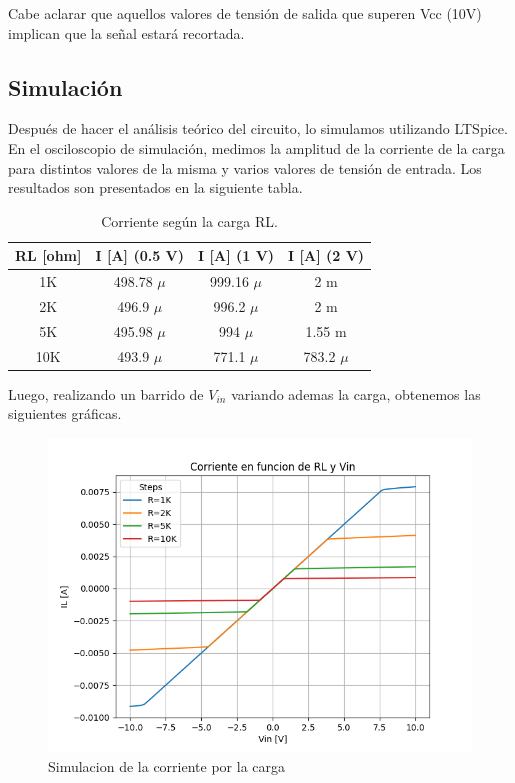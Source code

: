Cabe aclarar que aquellos valores de tensión de salida que superen Vcc (10V) implican que la señal estará recortada.


\subsection{Simulación}
Después de hacer el análisis teórico del circuito, lo simulamos utilizando LTSpice. En el osciloscopio de simulación, medimos la amplitud de la corriente de la carga para distintos valores de la misma y varios valores de tensión de entrada. Los resultados son presentados en la siguiente tabla.

\begin{table}[h!]
\centering
\begin{tabular}{|c|c|c|c|}
\hline
\textbf{RL [ohm]} & \textbf{I [A] (0.5 V)} & \textbf{I [A] (1 V)} & \textbf{I [A] (2 V)} \\ \hline
1K    & 498.78 $\mu$  & 999.16 $\mu$  & 2 m \\ \hline
2K    & 496.9 $\mu$  & 996.2 $\mu$  & 2 m \\ \hline
5K    & 495.98 $\mu$  & 994 $\mu$  & 1.55 m \\ \hline
10K   & 493.9 $\mu$  & 771.1 $\mu$  & 783.2 $\mu$ \\ \hline
\end{tabular}
\caption{Corriente según la carga RL.}
\label{tab:iL_vs_RL}
\end{table}
Luego, realizando un barrido de $V_{in}$ variando ademas la carga, obtenemos las siguientes gráficas.

\begin{figure}[H]
    \centering
    \includegraphics[width=0.70\linewidth]{Secciones/Circuito2/TP1_2_i_vs_Vin_RL.png}
    \caption{Simulacion de la corriente por la carga}
\end{figure}

